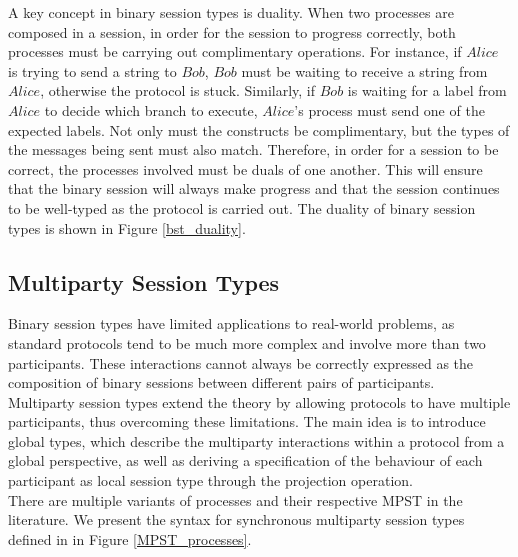 \documentclass[12pt,twoside]{report}
\begin{document}
A key concept in binary session types is duality. When two processes are composed in a session, in order for the session to progress correctly, both processes must be carrying out complimentary operations. For instance, if $Alice$ is trying to send a string to $Bob$, $Bob$ must be waiting to receive a string from $Alice$, otherwise the protocol is stuck. Similarly, if $Bob$ is waiting for a label from $Alice$ to decide which branch to execute, $Alice$'s process must send one of the expected labels. Not only must the constructs be complimentary, but the types of the messages being sent must also match. Therefore, in order for a session to be correct, the processes involved must be duals of one another. This will ensure that the binary session will always make progress and that the session continues to be well-typed as the protocol is carried out. The duality of binary session types is shown in Figure \ref{bst_duality}.



\subsection{Multiparty Session Types}
Binary session types have limited applications to real-world problems, as standard protocols tend to be much more complex and involve more than two participants. These interactions cannot always be correctly expressed as the composition of binary sessions between different pairs of participants. \\

Multiparty session types\cite{asyncmpst2} extend the theory by allowing protocols to have multiple participants, thus overcoming these limitations. The main idea is to introduce global types, which describe the multiparty interactions within a protocol from a global perspective, as well as deriving a specification of the behaviour of each participant as local session type through the projection operation. \\

There are multiple variants of processes and their respective MPST in the literature. We present the syntax for synchronous multiparty session types defined in \cite{verygentleintrotompst} in Figure \ref{MPST_processes}.
\end{document}

